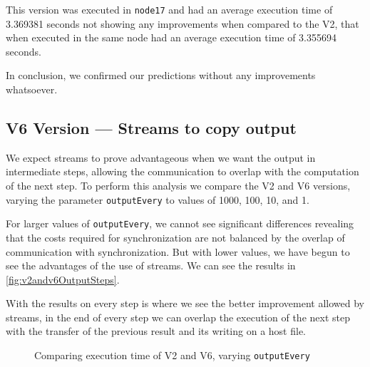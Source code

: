 \documentclass[conference]{IEEEtran}
\begin{document}
This version was executed in \texttt{node17} and had an average execution time of 3.369381 seconds not showing any improvements when compared to the V2, that when executed in the same node had an average execution time of 3.355694 seconds.

In conclusion, we confirmed our predictions without any improvements whatsoever.


\subsection{V6 Version --- Streams to copy output}
We expect streams to prove advantageous when we want the output in intermediate steps, allowing the communication to overlap with the computation of the next step. To perform this analysis we compare the V2 and V6 versions, varying the parameter \texttt{outputEvery} to values of 1000, 100, 10, and 1.

For larger values of \texttt{outputEvery}, we cannot see significant differences revealing that the costs required for synchronization are not balanced by the overlap of communication with synchronization. But with lower values, we have begun to see the advantages of the use of streams. We can see the results in \autoref{fig:v2andv6OutputSteps}.

With the results on every step is where we see the better improvement allowed by streams, in the end of every step we can overlap the execution of the next step with the transfer of the previous result and its writing on a host file.


\begin{figure}[ht]
  \centering
  \caption{Comparing execution time of V2 and V6, varying \texttt{outputEvery}}
  \label{fig:v2andv6OutputSteps}
\end{figure}
\end{document}
